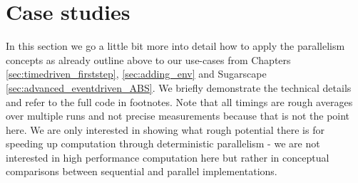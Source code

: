 \section{Case studies}
In this section we go a little bit more into detail how to apply the parallelism concepts as already outline above to our use-cases from Chapters \ref{sec:timedriven_firststep}, \ref{sec:adding_env} and Sugarscape \ref{sec:advanced_eventdriven_ABS}. We briefly demonstrate the technical details and refer to the full code in footnotes. Note that all timings are rough averages over multiple runs and not precise measurements because that is not the point here. We are only interested in showing what rough potential there is for speeding up computation through deterministic parallelism - we are not interested in high performance computation here but rather in conceptual comparisons between sequential and parallel implementations.




\\
